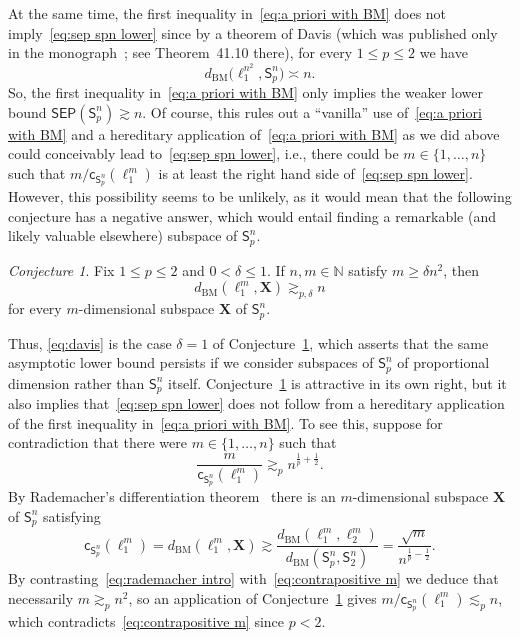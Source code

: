 \documentclass[11pt,reqno]{amsart}
\renewcommand{\le}{\leqslant}
\renewcommand{\ge}{\geqslant}
\renewcommand{\d}{\delta}
\newcommand{\cc}{\mathsf{c}}
\newcommand{\n}{\{1,\ldots,n\}}
\newcommand{\X}{\mathbf X}
\theoremstyle{remark}
\newtheorem{conjecture}[theorem]{Conjecture}
\newcommand{\sfS}{\mathsf{S}}
\newcommand{\N}{\mathbb N}
\newcommand{\BM}{\mathrm{BM}}
\renewcommand{\1}{\mathbf 1}
\newcommand{\sep}{\mathsf{SEP}}
\begin{document}
At the same time, the first inequality in~\eqref{eq:a priori with BM} does not imply~\eqref{eq:sep spn lower} since  by a theorem of Davis (which was published only in the monograph~\cite{Tom89}; see Theorem~41.10 there), for every $1\le p\le 2$ we have
\begin{equation}\label{eq:davis}
d_{\BM}\big(\ell_1^{n^2},\sfS_p^n\big)\asymp n.
\end{equation}
So, the first inequality in~\eqref{eq:a priori with BM} only implies the weaker lower bound $\sep(\sfS_p^n)\gtrsim n$. Of course, this  rules out  a ``vanilla'' use of~\eqref{eq:a priori with BM} and  a hereditary application of~\eqref{eq:a priori with BM} as we did above could conceivably lead to~\eqref{eq:sep spn lower}, i.e., there could be $m\in \n$ such that $m/\cc_{\sfS_p^n}(\ell_1^m)$ is at least the right hand side of~\eqref{eq:sep spn lower}. However, this possibility seems to be unlikely, as it would mean that the following conjecture has a negative answer, which would entail finding a remarkable (and likely valuable elsewhere) subspace of $\sfS_p^n$.


\begin{conjecture}\label{con:proportional subspace of schatten} Fix $1\le p\le 2$ and $0<\d\le 1$. If $n,m\in \N$ satisfy $m\ge \d n^2$, then
$$
d_{\BM}(\ell_1^m,\X)\gtrsim_{p,\d} n
$$
for every $m$-dimensional subspace $\X$ of $\sfS_p^n$.
\end{conjecture}
Thus, \eqref{eq:davis} is the case $\d=1$ of Conjecture~\ref{con:proportional subspace of schatten}, which asserts that the same asymptotic lower bound persists if we consider subspaces of $\sfS_p^n$ of proportional dimension rather than $\sfS_p^n$  itself. Conjecture~\ref{con:proportional subspace of schatten} is attractive in its own right, but it also implies that~\eqref{eq:sep spn lower} does not follow from a hereditary application of  the first inequality in~\eqref{eq:a priori with BM}. To see this,  suppose for contradiction  that there were $m\in \n$ such that
\begin{equation}\label{eq:contrapositive m}
\frac{m}{\cc_{\sfS_p^n}(\ell_1^m)}\gtrsim_p n^{\frac{1}{p}+\frac12}.
\end{equation}
By Rademacher's differentiation theorem~\cite{Rad19} there is an $m$-dimensional subspace $\X$ of $\sfS_p^n$ satisfying
\begin{equation}\label{eq:rademacher intro}
\cc_{\sfS_p^n}(\ell_1^m)=d_{\BM}(\ell_1^m,\X)\gtrsim \frac{d_{\BM}(\ell_1^m,\ell_2^m)}{d_{\BM}(\sfS_p^n,\sfS_2^n)}=\frac{\sqrt{m}}{n^{\frac{1}{p}-\frac{1}{2}}}.
\end{equation}
By contrasting~\eqref{eq:rademacher intro} with~\eqref{eq:contrapositive m} we deduce that necessarily $m\gtrsim_p n^2$, so an application of Conjecture~\ref{con:proportional subspace of schatten} gives $m/\cc_{\sfS_p^n}(\ell_1^m)\lesssim_p n$, which contradicts~\eqref{eq:contrapositive m}  since $p<2$.
\end{document}
